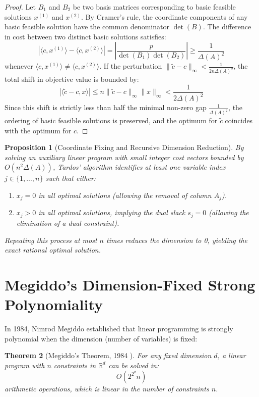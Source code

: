 \documentclass[11pt,a4paper]{article}
\newtheorem{theorem}{Theorem}[section]
\newtheorem{proposition}[theorem]{Proposition}
\theoremstyle{definition}
\begin{document}
\begin{proof}
Let $B_1$ and $B_2$ be two basis matrices corresponding to basic feasible solutions $x^{(1)}$ and $x^{(2)}$.
By Cramer's rule, the coordinate components of any basic feasible solution have the common denominator $\det(B)$.
The difference in cost between two distinct basic solutions satisfies:
\[ |\langle c, x^{(1)} \rangle - \langle c, x^{(2)} \rangle| = \left| \frac{p}{\det(B_1) \det(B_2)} \right| \ge \frac{1}{\Delta(A)^2} \]
whenever $\langle c, x^{(1)} \rangle \ne \langle c, x^{(2)} \rangle$.
If the perturbation $\|\tilde{c} - c\|_\infty < \frac{1}{2 n \Delta(A)^2}$, the total shift in objective value is bounded by:
\[ |\langle \tilde{c} - c, x \rangle| \le n \|\tilde{c} - c\|_\infty \|x\|_\infty < \frac{1}{2 \Delta(A)^2} \]
Since this shift is strictly less than half the minimal non-zero gap $\frac{1}{\Delta(A)^2}$, the ordering of basic feasible solutions is preserved, and the optimum for $\tilde{c}$ coincides with the optimum for $c$.
\end{proof}

\begin{proposition}[Coordinate Fixing and Recursive Dimension Reduction]\label{prop:tardos_reduction}
By solving an auxiliary linear program with small integer cost vectors bounded by $O(n^2 \Delta(A))$, Tardos' algorithm identifies at least one variable index $j \in \{1, \dots, n\}$ such that either:
\begin{enumerate}
    \item $x_j = 0$ in all optimal solutions (allowing the removal of column $A_j$).
    \item $x_j > 0$ in all optimal solutions, implying the dual slack $s_j = 0$ (allowing the elimination of a dual constraint).
\end{enumerate}
Repeating this process at most $n$ times reduces the dimension to 0, yielding the exact rational optimal solution.
\end{proposition}

\section{Megiddo's Dimension-Fixed Strong Polynomiality}

In 1984, Nimrod Megiddo \cite{megiddo1984} established that linear programming is strongly polynomial when the dimension (number of variables) is fixed:

\begin{theorem}[Megiddo's Theorem, 1984 \cite{megiddo1984}]\label{thm:megiddo}
For any fixed dimension $d$, a linear program with $n$ constraints in $\mathbb{R}^d$ can be solved in:
\begin{equation}\label{eq:megiddo_bound}
O(2^{2^d} n)
\end{equation}
arithmetic operations, which is linear in the number of constraints $n$.
\end{theorem}
\end{document}
